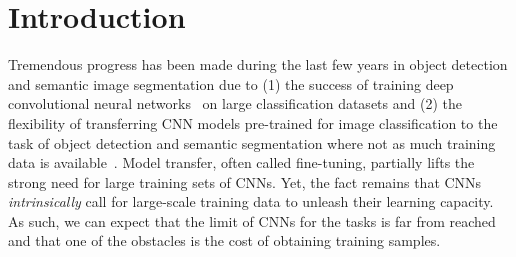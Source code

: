 \documentclass[runningheads]{llncs}
\begin{document}
\section{Introduction}

Tremendous progress has been made during the last few years in 
object detection and semantic image segmentation due to (1) the success of
training deep convolutional neural networks~\citep{deepnet:nips12, Decaf:icml2014, vgg16} on large classification datasets and (2) the
flexibility of transferring CNN models pre-trained for image classification to the
task of object detection and semantic segmentation where not as much training data is
available~\citep{rcnn, Long_2015_CVPR, rcnn_crf}. Model transfer,
often called fine-tuning, partially lifts the strong need for large
training sets of CNNs. Yet, the fact remains that CNNs \emph{intrinsically} 
call for large-scale training data to unleash their learning capacity. 
As such, we can expect that the limit of CNNs for the tasks
is far from reached and that one of the obstacles 
is the cost of obtaining training samples.  
\end{document}
